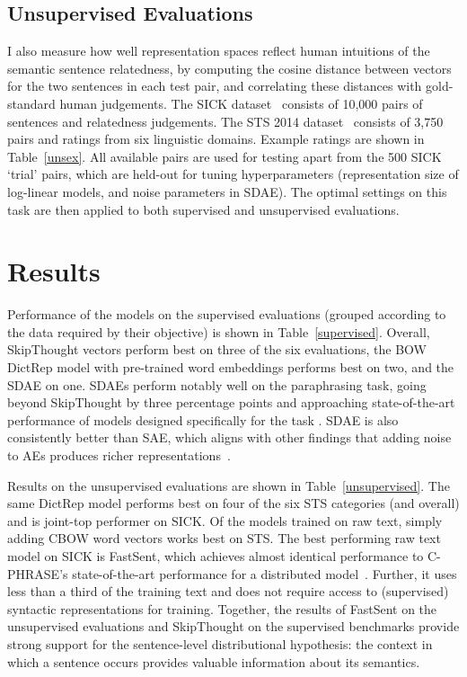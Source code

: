 \subsection{Unsupervised Evaluations}
\label{unseval}
I also measure how well representation spaces reflect human intuitions of the semantic sentence relatedness, by computing the cosine distance between vectors for the two sentences in each test pair, and correlating these distances with gold-standard human judgements. The SICK dataset~\citep{marelli2014sick} consists of 10,000 pairs of sentences and relatedness judgements. The STS 2014 dataset~\citep{agirre2014semeval} consists of 3,750 pairs and ratings from six linguistic domains. Example ratings are shown in Table~\ref{unsex}. All available pairs are used for testing apart from the 500 SICK `trial' pairs, which are held-out for tuning hyperparameters (representation size of log-linear models, and noise parameters in SDAE). The optimal settings on this task are then applied to both supervised and unsupervised evaluations.  



\section{Results}

Performance of the models on the supervised evaluations (grouped according to the data required by their objective) is shown in Table~\ref{supervised}. Overall, SkipThought vectors perform best on three of the six evaluations, the BOW DictRep model with pre-trained word embeddings performs best on two, and the SDAE on one. SDAEs perform notably well on the paraphrasing task, going beyond SkipThought by three percentage points and approaching state-of-the-art performance of models designed specifically for the task \citep{ji2013discriminative}. SDAE is also consistently better than SAE, which aligns with other findings that adding noise to AEs produces richer representations~\citep{vincent2008extracting}.  

Results on the unsupervised evaluations are shown in Table~\ref{unsupervised}. The same DictRep model performs best on four of the six STS categories (and overall) and is joint-top performer on SICK. Of the models trained on raw text, simply adding CBOW word vectors works best on STS. The best performing raw text model on SICK is FastSent, which achieves almost identical performance to C-PHRASE's state-of-the-art performance for a distributed model~\citep{marcobaronijointly}. Further, it uses less than a third of the training text and does not require access to (supervised) syntactic representations for training. Together, the results of FastSent on the unsupervised evaluations and SkipThought on the supervised benchmarks provide strong support for the sentence-level distributional hypothesis: the context in which a sentence occurs provides valuable  information about its semantics.

